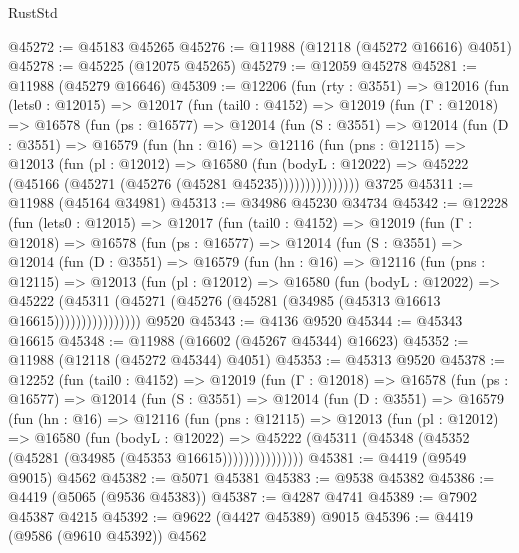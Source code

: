 \begin{lexlean}{RustStd}
\begin{coremodule}
@45272 := @45183 @45265
@45276 := @11988 (@12118 (@45272 @16616) @4051)
@45278 := @45225 (@12075 @45265)
@45279 := @12059 @45278
@45281 := @11988 (@45279 @16646)
@45309 := @12206
    (fun (rty : @3551) =>
    @12016
      (fun (lets0 : @12015) =>
      @12017
        (fun (tail0 : @4152) =>
        @12019
          (fun (Γ : @12018) =>
          @16578
            (fun (ps : @16577) =>
            @12014
              (fun (S : @3551) =>
              @12014
                (fun (D : @3551) =>
                @16579
                  (fun (hn : @16) =>
                  @12116
                    (fun (pns : @12115) =>
                    @12013
                      (fun (pl : @12012) =>
                      @16580
                        (fun (bodyL : @12022) =>
                        @45222 (@45166 (@45271 (@45276 (@45281 @45235)))))))))))))))
    @3725
@45311 := @11988 (@45164 @34981)
@45313 := @34986 @45230 @34734
@45342 := @12228
    (fun (lets0 : @12015) =>
    @12017
      (fun (tail0 : @4152) =>
      @12019
        (fun (Γ : @12018) =>
        @16578
          (fun (ps : @16577) =>
          @12014
            (fun (S : @3551) =>
            @12014
              (fun (D : @3551) =>
              @16579
                (fun (hn : @16) =>
                @12116
                  (fun (pns : @12115) =>
                  @12013
                    (fun (pl : @12012) =>
                    @16580
                      (fun (bodyL : @12022) =>
                      @45222
                        (@45311
                          (@45271 (@45276 (@45281 (@34985 (@45313 @16613 @16615))))))))))))))))
    @9520
@45343 := @4136 @9520
@45344 := @45343 @16615
@45348 := @11988 (@16602 (@45267 @45344) @16623)
@45352 := @11988 (@12118 (@45272 @45344) @4051)
@45353 := @45313 @9520
@45378 := @12252
    (fun (tail0 : @4152) =>
    @12019
      (fun (Γ : @12018) =>
      @16578
        (fun (ps : @16577) =>
        @12014
          (fun (S : @3551) =>
          @12014
            (fun (D : @3551) =>
            @16579
              (fun (hn : @16) =>
              @12116
                (fun (pns : @12115) =>
                @12013
                  (fun (pl : @12012) =>
                  @16580
                    (fun (bodyL : @12022) =>
                    @45222 (@45311 (@45348 (@45352 (@45281 (@34985 (@45353 @16615)))))))))))))))
@45381 := @4419 (@9549 @9015) @4562
@45382 := @5071 @45381
@45383 := @9538 @45382
@45386 := @4419 (@5065 (@9536 @45383))
@45387 := @4287 @4741
@45389 := @7902 @45387 @4215
@45392 := @9622 (@4427 @45389) @9015
@45396 := @4419 (@9586 (@9610 @45392)) @4562

\end{coremodule}
\end{lexlean}
